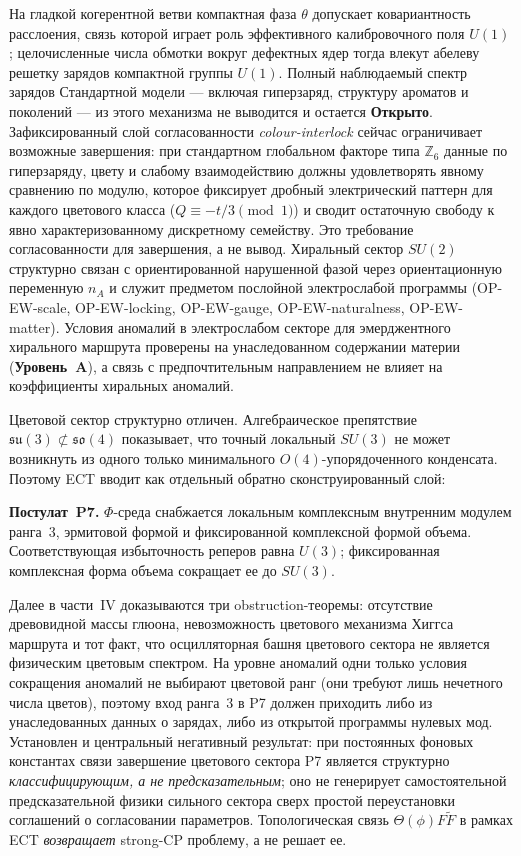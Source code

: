 \documentclass[11pt,a4paper]{article}
\newcommand{\statA}{\textbf{Уровень~A}}
\newcommand{\statO}{\textbf{Открыто}}
\begin{document}
На гладкой когерентной ветви компактная фаза $\theta$ допускает
ковариантность расслоения, связь которой играет роль эффективного
калибровочного поля $U(1)$; целочисленные числа обмотки вокруг
дефектных ядер тогда влекут абелеву решетку зарядов компактной
группы $U(1)$. Полный наблюдаемый спектр зарядов Стандартной модели —
включая гиперзаряд, структуру ароматов и поколений — из этого
механизма не выводится и остается \statO.
Зафиксированный слой согласованности \emph{colour-interlock}
сейчас ограничивает возможные завершения: при стандартном
глобальном факторе типа $\mathbb{Z}_6$ данные по гиперзаряду,
цвету и слабому взаимодействию должны удовлетворять явному
сравнению по модулю, которое фиксирует дробный электрический
паттерн для каждого цветового класса
($Q\equiv -t/3 \pmod 1$) и сводит остаточную свободу к явно
характеризованному дискретному семейству. Это требование
согласованности для завершения, а не вывод.
Хиральный сектор $SU(2)$ структурно связан с ориентированной
нарушенной фазой через ориентационную переменную $n_A$ и служит
предметом послойной электрослабой программы
(OP-EW-scale, OP-EW-locking, OP-EW-gauge, OP-EW-naturalness,
OP-EW-matter). Условия аномалий в электрослабом секторе для
эмерджентного хирального маршрута проверены на унаследованном
содержании материи (\statA), а связь с предпочтительным
направлением не влияет на коэффициенты хиральных аномалий.

Цветовой сектор структурно отличен.
Алгебраическое препятствие $\mathfrak{su}(3)\not\subset
\mathfrak{so}(4)$ показывает, что точный локальный $SU(3)$ не
может возникнуть из одного только минимального
$O(4)$-упорядоченного конденсата. Поэтому ECT вводит как
отдельный обратно сконструированный слой:

\textbf{Постулат~P7.}
$\Phi$-среда снабжается локальным комплексным внутренним модулем
ранга~3, эрмитовой формой и фиксированной комплексной формой
объема. Соответствующая избыточность реперов равна $U(3)$;
фиксированная комплексная форма объема сокращает ее до $SU(3)$.

Далее в части~IV доказываются три obstruction-теоремы:
отсутствие древовидной массы глюона, невозможность цветового
механизма Хиггса
маршрута и тот факт, что осцилляторная башня цветового сектора не
является физическим цветовым спектром.
На уровне аномалий одни только условия сокращения аномалий не
выбирают цветовой ранг (они требуют лишь нечетного числа цветов),
поэтому вход ранга~3 в P7 должен приходить либо из
унаследованных данных о зарядах, либо из открытой программы
нулевых мод.
Установлен и центральный негативный результат: при постоянных
фоновых константах связи завершение цветового сектора P7
является структурно \emph{классифицирующим, а не
предсказательным}; оно не генерирует самостоятельной
предсказательной физики сильного сектора сверх простой
переустановки соглашений о согласовании параметров.
Топологическая связь $\Theta(\phi)F\tilde{F}$ в рамках ECT
\emph{возвращает} strong-CP проблему, а не решает ее.
\end{document}
